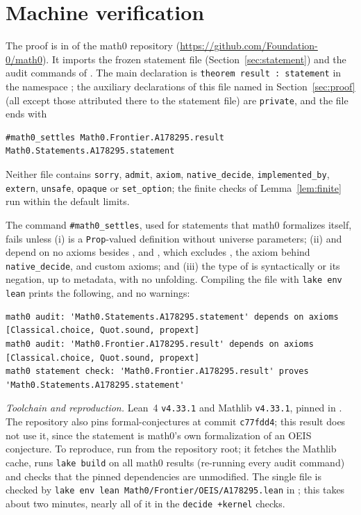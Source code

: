 \documentclass[11pt]{amsart}
\theoremstyle{plain}
\theoremstyle{definition}
\begin{document}
\section{Machine verification}\label{sec:lean}

The proof is in  of the math0 repository (\url{https://github.com/Foundation-0/math0}). It imports the frozen statement file (Section~\ref{sec:statement}) and the audit commands of . The main declaration is \lstinline{theorem result : statement} in the namespace ; the auxiliary declarations of this file named in Section~\ref{sec:proof} (all except those attributed there to the statement file) are \texttt{private}, and the file ends with
\begin{lstlisting}[basicstyle=\ttfamily\footnotesize]
#math0_settles Math0.Frontier.A178295.result Math0.Statements.A178295.statement
\end{lstlisting}
Neither file contains \texttt{sorry}, \texttt{admit}, \texttt{axiom}, \texttt{native\_decide}, \texttt{implemented\_by}, \texttt{extern}, \texttt{unsafe}, \texttt{opaque} or \texttt{set\_option}; the finite checks of Lemma~\ref{lem:finite} run within the default limits.

The command \texttt{\#math0\_settles}, used for statements that math0 formalizes itself, fails unless (i)  is a \texttt{Prop}-valued definition without universe parameters; (ii)  and  depend on no axioms besides ,  and , which excludes , the axiom  behind \texttt{native\_decide}, and custom axioms; and (iii) the type of  is syntactically  or its negation, up to metadata, with no unfolding. Compiling the file with \texttt{lake env lean} prints the following, and no warnings:
\begin{lstlisting}[basicstyle=\ttfamily\scriptsize]
math0 audit: 'Math0.Statements.A178295.statement' depends on axioms [Classical.choice, Quot.sound, propext]
math0 audit: 'Math0.Frontier.A178295.result' depends on axioms [Classical.choice, Quot.sound, propext]
math0 statement check: 'Math0.Frontier.A178295.result' proves 'Math0.Statements.A178295.statement'
\end{lstlisting}

\emph{Toolchain and reproduction.} Lean~4 \cite{Lean4} \texttt{v4.33.1} and Mathlib \cite{Mathlib} \texttt{v4.33.1}, pinned in . The repository also pins formal-conjectures \cite{FC} at commit \texttt{c77fdd4}; this result does not use it, since the statement is math0's own formalization of an OEIS conjecture. To reproduce, run  from the repository root; it fetches the Mathlib cache, runs \texttt{lake build} on all math0 results (re-running every audit command) and checks that the pinned dependencies are unmodified. The single file is checked by \texttt{lake env lean Math0/Frontier/OEIS/A178295.lean} in ; this takes about two minutes, nearly all of it in the \texttt{decide +kernel} checks.
\end{document}
